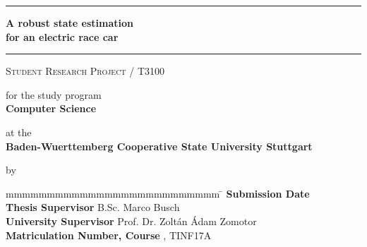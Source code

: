\hfill
{}

\vfill
\begin{center}
	\rule{\textwidth}{1pt}
	{
		\Huge
		\bfseries
		A robust state estimation \\ for an electric race car
		\par
	}
	\vspace{-0.2cm} 
	\rule{\textwidth}{1pt}

	\vfill

	\textsc{Student Research Project / T3100}
	
	\vfill

	for the study program \\ \textbf{Computer Science}
	
	at the \\ \textbf{Baden-Wuerttemberg Cooperative State University Stuttgart}
	
	by \\ \textbf{\@author}
\end{center}

\vfill

\begin{tabbing}
	mmmmmmmmmmmmmmmmmmmmmmmmmm				\= \kill
	\textbf{Submission Date}				\> \@date \\
	\textbf{Thesis Supervisor}           	\> B.Sc. Marco Busch \\
	\textbf{University Supervisor}          \> Prof. Dr. Zoltán Ádam Zomotor \\
	\textbf{Matriculation Number, Course}  	, TINF17A
\end{tabbing}
